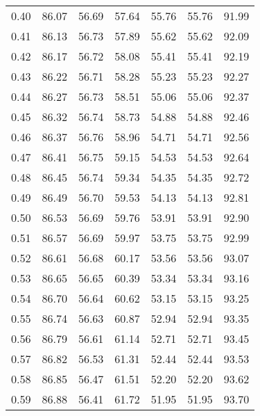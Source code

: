 \begin{tabular}{|c|c|c|c|c|c|c|}
      0.40 &     86.07 &     56.69 &      57.64 &   55.76 &      55.76 &         91.99 \\
      0.41 &     86.13 &     56.73 &      57.89 &   55.62 &      55.62 &         92.09 \\
      0.42 &     86.17 &     56.72 &      58.08 &   55.41 &      55.41 &         92.19 \\
      0.43 &     86.22 &     56.71 &      58.28 &   55.23 &      55.23 &         92.27 \\
      0.44 &     86.27 &     56.73 &      58.51 &   55.06 &      55.06 &         92.37 \\
      0.45 &     86.32 &     56.74 &      58.73 &   54.88 &      54.88 &         92.46 \\
      0.46 &     86.37 &     56.76 &      58.96 &   54.71 &      54.71 &         92.56 \\
      0.47 &     86.41 &     56.75 &      59.15 &   54.53 &      54.53 &         92.64 \\
      0.48 &     86.45 &     56.74 &      59.34 &   54.35 &      54.35 &         92.72 \\
      0.49 &     86.49 &     56.70 &      59.53 &   54.13 &      54.13 &         92.81 \\
      0.50 &     86.53 &     56.69 &      59.76 &   53.91 &      53.91 &         92.90 \\
      0.51 &     86.57 &     56.69 &      59.97 &   53.75 &      53.75 &         92.99 \\
      0.52 &     86.61 &     56.68 &      60.17 &   53.56 &      53.56 &         93.07 \\
      0.53 &     86.65 &     56.65 &      60.39 &   53.34 &      53.34 &         93.16 \\
      0.54 &     86.70 &     56.64 &      60.62 &   53.15 &      53.15 &         93.25 \\
      0.55 &     86.74 &     56.63 &      60.87 &   52.94 &      52.94 &         93.35 \\
      0.56 &     86.79 &     56.61 &      61.14 &   52.71 &      52.71 &         93.45 \\
      0.57 &     86.82 &     56.53 &      61.31 &   52.44 &      52.44 &         93.53 \\
      0.58 &     86.85 &     56.47 &      61.51 &   52.20 &      52.20 &         93.62 \\
      0.59 &     86.88 &     56.41 &      61.72 &   51.95 &      51.95 &         93.70 \\

\end{tabular}
